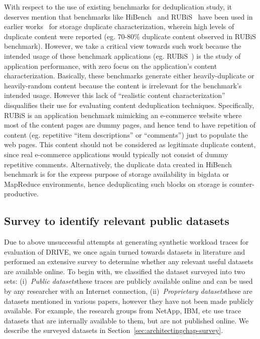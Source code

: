 With respect to the use of existing benchmarks for deduplication study, 
it deserves mention that benchmarks like HiBench~\cite{hibench} and RUBiS~\cite{rubis}
have been used in earlier works~\cite{deduping-hibench}
for storage duplicate characterization, wherein 
high levels of duplicate content were reported (eg. 70-80\% duplicate
content observed in RUBiS benchmark). 
However, we take a critical view towards such work because the
intended usage of these benchmark applications (eg. RUBiS~\cite{rubis})
is the study of application performance,
with zero focus on the application's content characterization. 
Basically, these benchmarks generate either heavily-duplicate 
or heavily-random content because the content is irrelevant for the benchmark's intended usage.
However this lack of ``realistic content characterization'' disqualifies their use
for evaluating content deduplication techniques.
Specifically, RUBiS is an application benchmark mimicking
an e-commerce website where most of the content pages are dummy pages, and
hence tend to have repetition of content (eg. repetitive ``item descriptions'' or
``comments'') just to populate the web pages. This content
should not be considered as legitimate duplicate 
content,
since real e-commerce applications would 
typically not consist of dummy repetitive comments.
Alternatively, the duplicate data created in HiBench benchmark is for 
the express purpose of storage availability in 
bigdata or MapReduce environments, 
hence deduplicating such blocks on storage is counter-productive.  

\subsection{Survey to identify relevant public datasets}
Due to above unsuccessful attempts at generating synthetic workload traces
for evaluation of DRIVE, we once again turned towards datasets in literature
and performed an extensive survey to determine whether any 
relevant useful datasets are available online. 
To begin with, we classified the dataset surveyed into
two sets: (i)~\textit{Public datasets}\textemdash{}these traces are publicly available
online and can be used by any researcher with an Internet connection,
(ii)~\textit{Proprietary datasets}\textemdash{}these are datasets mentioned in various
papers, however they have not been made publicly available. For example, 
the research groups from NetApp, IBM, etc use trace datasets that are 
internally available to them, but are not published online. We describe
the surveyed datasets in Section~\ref{sec:architectingchap-survey}.

